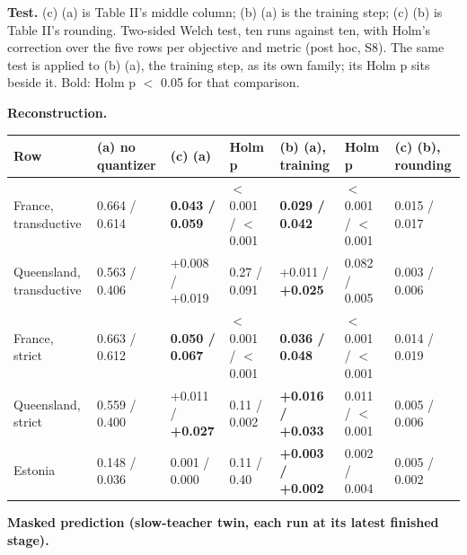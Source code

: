 \documentclass[10pt]{article}
\begin{document}
\textbf{Test.} (c) \textminus{} (a) is Table II's middle column; (b) \textminus{} (a) is the training step; (c) \textminus{} (b) is Table II's rounding. Two-sided Welch test, ten runs against ten, with Holm's correction over the five rows per objective and metric (post hoc, S8). The same test is applied to (b) \textminus{} (a), the training step, as its own family; its Holm p sits beside it. Bold: Holm p $<$ 0.05 for that comparison.

\textbf{Reconstruction.}

{\footnotesize
\begin{xltabular}{\linewidth}{@{}llllllX@{}}
\toprule
Row & (a) no quantizer & (c) \textminus{} (a) & Holm p & (b) \textminus{} (a), training & Holm p & (c) \textminus{} (b), rounding \\
\midrule
\endhead
France, transductive & 0.664 / 0.614 & \textbf{\textminus{}0.043 / \textminus{}0.059} & $<$0.001 / $<$0.001 & \textbf{\textminus{}0.029 / \textminus{}0.042} & $<$0.001 / $<$0.001 & \textminus{}0.015 / \textminus{}0.017 \\
Queensland, transductive & 0.563 / 0.406 & +0.008 / +0.019 & 0.27 / 0.091 & +0.011 / \textbf{+0.025} & 0.082 / 0.005 & \textminus{}0.003 / \textminus{}0.006 \\
France, strict & 0.663 / 0.612 & \textbf{\textminus{}0.050 / \textminus{}0.067} & $<$0.001 / $<$0.001 & \textbf{\textminus{}0.036 / \textminus{}0.048} & $<$0.001 / $<$0.001 & \textminus{}0.014 / \textminus{}0.019 \\
Queensland, strict & 0.559 / 0.400 & +0.011 / \textbf{+0.027} & 0.11 / 0.002 & \textbf{+0.016 / +0.033} & 0.011 / $<$0.001 & \textminus{}0.005 / \textminus{}0.006 \\
Estonia & 0.148 / 0.036 & \textminus{}0.001 / 0.000 & 0.11 / 0.40 & \textbf{+0.003 / +0.002} & 0.002 / 0.004 & \textminus{}0.005 / \textminus{}0.002 \\
\bottomrule
\end{xltabular}}

\textbf{Masked prediction (slow-teacher twin, each run at its latest finished stage).}
\end{document}
